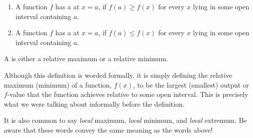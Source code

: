 \documentclass{ximera}
\begin{document}
\begin{definition}\hfil{}
\begin{enumerate}
\item A function $f$ has a  at $x=a$, if $f(a) \ge
  f(x)$ for every $x$ lying in some open interval containing $a$.
\item A function $f$ has a  at $x=a$, if $f(a) \le
  f(x)$ for every $x$ lying in some open interval containing $a$.
\end{enumerate}
A  is either a relative
maximum or a relative minimum.
\end{definition}

\begin{explanation}
Although this definition is worded formally, it is simply defining the relative maximum (minimum) of a function, $f(x)$, to be the largest (smallest) output or $f$-value that the function achieves relative to some open interval.  This is precisely what we were talking about informally before the definition. 
\end{explanation}

\begin{warning}
It is also common to say \textit{local} maximum, \textit{local} minimum, and \textit{local} extremum.  Be aware that these words convey the same meaning as the words above!  
\end{warning}
\end{document}
